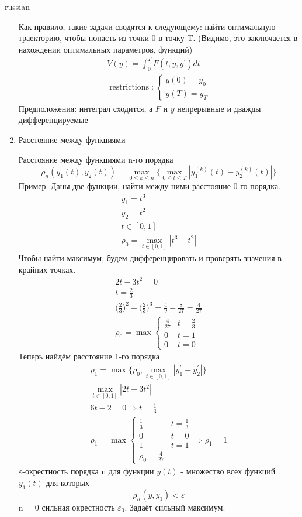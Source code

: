 \documentclass{article}
\begin{document}
\begin{otherlanguage*}{russian}
\begin{enumerate}
Как правило, такие задачи сводятся к следующему: найти оптимальную траекторию, чтобы попасть из точки 0 в точку T. (Видимо, это заключается в нахождении оптимальных параметров, функций) 
\begin{align}
V(y) = \int_0^T F(t, y, y^{'}) dt \\
\operatorname{restrictions}: \begin{cases} 
y(0) = y_0 \\
y(T) = y_T 
\end{cases} 
\end{align}
Предположения: интеграл сходится, а $F$ и $y$ непрерывные и дважды дифференцируемые

\item Расстояние между функциями

Расстояние между функциями n-го порядка 
\begin{equation}
\rho_n (y_1 (t), y_2(t)) = \max_{0 \le k \le n} \{ \max_{0 \le t \le T} | y_1^{(k)} (t) - y_2^{(k)} (t) | \}
\end{equation}
Пример. Даны две функции, найти между ними расстояние 0-го порядка. 
\begin{align}
y_1 = t ^ 3 \\
y_2 = t ^ 2 \\ 
t \in [0, 1 ] \\
\rho_0 = \max_{t \in [0,1]} |t ^ 3 - t ^ 2| 
\end{align}
Чтобы найти максимум, будем дифференцировать и проверять значения в крайних точках. 
\begin{align}
2t - 3 t ^ 2 = 0 \\
t = \frac{2}{3} \\
\Big(\frac{2}{3}\Big)^2 - \Big(\frac{2}{3}\Big)^3 = \frac{4}{9} - \frac{8}{27} = \frac{4}{27} \\
\rho_0 = \max \begin{cases} \frac{4}{27}& t = \frac{2}{3}\\ 0 & t = 1 \\ 0 & t = 0 \end{cases}
\end{align}
Теперь найдём расстояние 1-го порядка 
\begin{align} 
\rho_1 = \max \{ \rho_0, \max_{t \in [0,1]} |y_1^{'} - y_2^{'}|\} \\
 \max_{t \in [0,1]} |2t-3t^2| \\
 6 t - 2 = 0 \Rightarrow t = \frac{1}{3} \\
\rho_1 = \max
\begin{cases}
\frac{1}{3} & t = \frac{1}{3} \\
0 & t = 0 \\
1 & t = 1  \\
\rho_0 = \frac{4}{27} & \,\,
\end{cases}
\Rightarrow
\rho_1 = 1
\end{align}
$\varepsilon$-окрестность порядка n для функции $y(t)$ - множество всех функций $y_1(t)$ для которых 
\begin{equation}
\rho_n(y, y_1)<\varepsilon
\end{equation}
n = 0 сильная окрестность $\varepsilon_0$. Задаёт сильный максимум.


\end{enumerate}
\end{otherlanguage*}
\end{document}
